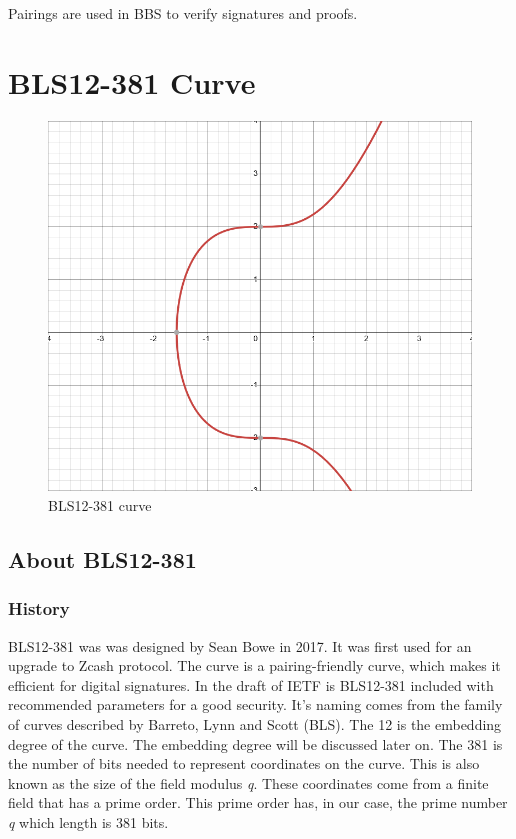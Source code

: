\documentclass{article}
\begin{document}
Pairings are used in \gls{BBS} to verify signatures and proofs.

\cite{buterin-pairings}
\cite{pairings-for-beginners}



\section{BLS12-381 Curve}
\begin{figure}[H]
\centering
\includegraphics[width=0.5\linewidth]{BLS12-381curve.png}
\caption{BLS12-381 curve}
\label{Fig: BLS12-381}
\end{figure}




\subsection{About BLS12-381}

\subsubsection{History}

BLS12-381 was was designed by Sean Bowe in 2017. It was first used for an upgrade to \gls{Zcash protocol}. The curve is a pairing-friendly curve, which makes it efficient for digital signatures. In the draft of \gls{IETF} is BLS12-381 included with recommended parameters for a good security. \newline
It's naming comes from the family of curves described by Barreto, Lynn and Scott (BLS). The 12 is the embedding degree of the curve. The embedding degree will be discussed later on. The 381 is the number of bits needed to represent coordinates on the curve. This is also known as the size of the field modulus \textit{q}. These coordinates come from a finite field that has a prime order. This prime order has, in our case, the prime number \textit{q} which length is 381 bits. \cite{snark-curve-blog}
\end{document}

